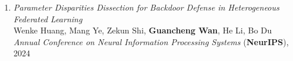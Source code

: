 \begin{enumerate}
    \item \textit{Parameter Disparities Dissection for Backdoor Defense in Heterogeneous Federated Learning} \\
    Wenke Huang, Mang Ye, Zekun Shi, \textbf{Guancheng Wan}, He Li, Bo Du \\
    \hfill \textit{Annual Conference on Neural Information Processing Systems} (\textbf{NeurIPS}), 2024
\end{enumerate}